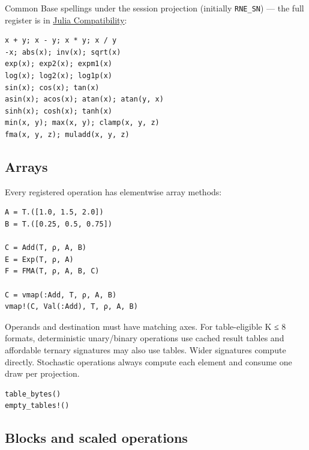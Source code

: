 Common Base spellings under the session projection (initially \texttt{RNE\_\allowbreak{}SN}) — the full register is in \href{reference\_\allowbreak{}julia\_\allowbreak{}compat.md}{Julia Compatibility}:




\nopagebreak[4]
\begin{verbatim}
x + y; x - y; x * y; x / y
-x; abs(x); inv(x); sqrt(x)
exp(x); exp2(x); expm1(x)
log(x); log2(x); log1p(x)
sin(x); cos(x); tan(x)
asin(x); acos(x); atan(x); atan(y, x)
sinh(x); cosh(x); tanh(x)
min(x, y); max(x, y); clamp(x, y, z)
fma(x, y, z); muladd(x, y, z)
\end{verbatim}



\subsection{Arrays}



\label{13119822296912292823}{}


Every registered operation has elementwise array methods:




\nopagebreak[4]
\begin{verbatim}
A = T.([1.0, 1.5, 2.0])
B = T.([0.25, 0.5, 0.75])

C = Add(T, ρ, A, B)
E = Exp(T, ρ, A)
F = FMA(T, ρ, A, B, C)

C = vmap(:Add, T, ρ, A, B)
vmap!(C, Val(:Add), T, ρ, A, B)
\end{verbatim}



Operands and destination must have matching axes. For table-eligible K ≤ 8 formats, deterministic unary/binary operations use cached result tables and affordable ternary signatures may also use tables. Wider signatures compute directly. Stochastic operations always compute each element and consume one draw per projection.




\begin{verbatim}
table_bytes()
empty_tables!()
\end{verbatim}



\subsection{Blocks and scaled operations}



